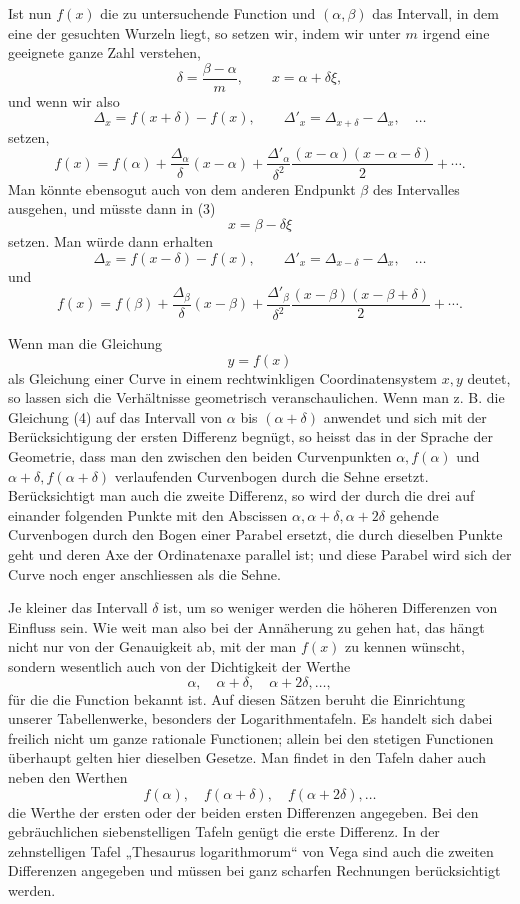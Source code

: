 \documentclass[11pt]{article}
\begin{document}
Ist nun $f(x)$ die zu untersuchende Function und $(\alpha,\beta)$ das Intervall, in dem eine der gesuchten Wurzeln liegt, so setzen wir, indem wir unter $m$ irgend eine geeignete ganze Zahl verstehen,
\[
        \delta=\frac{\beta-\alpha}{m},\qquad x=\alpha+\delta\xi,
\]
und wenn wir also
\[
        \Delta_x=f(x+\delta)-f(x),\qquad
        \Delta'_x=\Delta_{x+\delta}-\Delta_x,\quad\ldots
\]
setzen,
\begin{equation}
        f(x)=f(\alpha)+\frac{\Delta_\alpha}{\delta}(x-\alpha)
        +\frac{\Delta'_\alpha}{\delta^2}
          \frac{(x-\alpha)(x-\alpha-\delta)}{2}+\cdots .
\tag{4}
\end{equation}
Man könnte ebensogut auch von dem anderen Endpunkt $\beta$ des Intervalles ausgehen, und müsste dann in (3)
\[
        x=\beta-\delta\xi
\]
setzen. Man würde dann erhalten
\[
        \Delta_x=f(x-\delta)-f(x),\qquad
        \Delta'_x=\Delta_{x-\delta}-\Delta_x,\quad\ldots
\]
und
\begin{equation}
        f(x)=f(\beta)+\frac{\Delta_\beta}{\delta}(x-\beta)
        +\frac{\Delta'_\beta}{\delta^2}
          \frac{(x-\beta)(x-\beta+\delta)}{2}+\cdots .
\tag{5}
\end{equation}

Wenn man die Gleichung
\[
        y=f(x)
\]
als Gleichung einer Curve in einem rechtwinkligen Coordinatensystem $x,y$ deutet, so lassen sich die Verhältnisse geometrisch veranschaulichen. Wenn man z. B. die Gleichung (4) auf das Intervall von $\alpha$ bis $(\alpha+\delta)$ anwendet und sich mit der Berücksichtigung der ersten Differenz begnügt, so heisst das in der Sprache der Geometrie, dass man den zwischen den beiden Curvenpunkten $\alpha,f(\alpha)$ und $\alpha+\delta,f(\alpha+\delta)$ verlaufenden Curvenbogen durch die Sehne ersetzt. Berücksichtigt man auch die zweite Differenz, so wird der durch die drei auf einander folgenden Punkte mit den Abscissen $\alpha,\alpha+\delta,\alpha+2\delta$ gehende Curvenbogen durch den Bogen einer Parabel ersetzt, die durch dieselben Punkte geht und deren Axe der Ordinatenaxe parallel ist; und diese Parabel wird sich der Curve noch enger anschliessen als die Sehne.

Je kleiner das Intervall $\delta$ ist, um so weniger werden die höheren Differenzen von Einfluss sein. Wie weit man also bei der Annäherung zu gehen hat, das hängt nicht nur von der Genauigkeit ab, mit der man $f(x)$ zu kennen wünscht, sondern wesentlich auch von der Dichtigkeit der Werthe
\[
        \alpha,\quad \alpha+\delta,\quad \alpha+2\delta,\ldots,
\]
für die die Function bekannt ist. Auf diesen Sätzen beruht die Einrichtung unserer Tabellenwerke, besonders der Logarithmentafeln. Es handelt sich dabei freilich nicht um ganze rationale Functionen; allein bei den stetigen Functionen überhaupt gelten hier dieselben Gesetze. Man findet in den Tafeln daher auch neben den Werthen
\[
        f(\alpha),\quad f(\alpha+\delta),\quad f(\alpha+2\delta),\ldots
\]
die Werthe der ersten oder der beiden ersten Differenzen angegeben. Bei den gebräuchlichen siebenstelligen Tafeln genügt die erste Differenz. In der zehnstelligen Tafel „Thesaurus logarithmorum`` von Vega sind auch die zweiten Differenzen angegeben und müssen bei ganz scharfen Rechnungen berücksichtigt werden.
\end{document}
